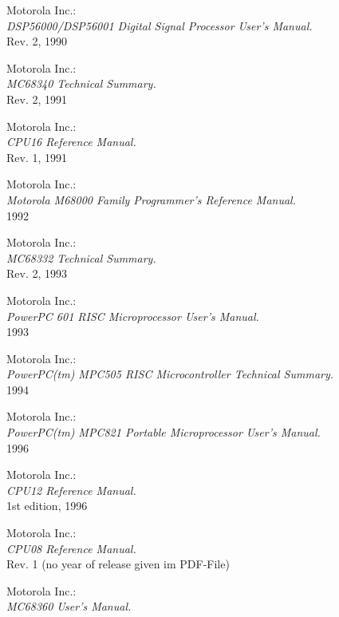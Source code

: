  Motorola Inc.: \\
                {\em DSP56000/DSP56001 Digital Signal Processor User's
                Manual.\/} \\
                Rev. 2, 1990

 Motorola Inc.: \\
                 {\em MC68340 Technical Summary.\/} \\
                 Rev. 2, 1991

 Motorola Inc.: \\
                {\em CPU16 Reference Manual.\/} \\
                Rev. 1, 1991

 Motorola Inc.: \\
                 {\em Motorola M68000 Family Programmer's
                  Reference Manual.\/} \\
                 1992

 Motorola Inc.: \\
                 {\em MC68332 Technical Summary.\/} \\
                 Rev. 2, 1993

 Motorola Inc.: \\
                 {\em PowerPC 601 RISC Microprocessor User's Manual.\/} \\
                 1993

 Motorola Inc.: \\
                 {\em PowerPC(tm) MPC505 RISC Microcontroller Technical
                 Summary.\/} \\
        	 1994

 Motorola Inc.: \\
                 {\em PowerPC(tm) MPC821 Portable Microprocessor User's Manual.\/} \\
                 1996

 Motorola Inc.: \\
                {\em CPU12 Reference Manual.\/} \\
                1st edition, 1996

 Motorola Inc.: \\
                {\em CPU08 Reference Manual.\/} \\
                Rev. 1 (no year of release given im PDF-File)

 Motorola Inc.: \\
                 {\em MC68360 User's Manual.\/}

